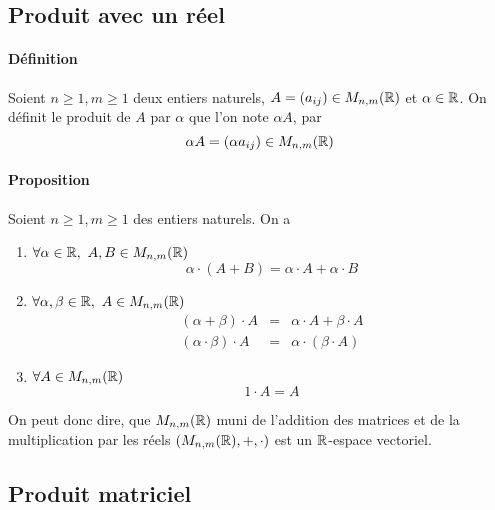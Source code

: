 
%
\subsection{Produit avec un réel}
%
\paragraph{Définition} Soient $n \geq 1, m \geq 1$ deux entiers naturels, $A = (a_{ij}) \in M_{n, m}(\mathbb{R})$ et $\alpha \in \mathbb{R}$. On  définit le produit de $A$ par $\alpha$ que l'on note $\alpha A$, par
$$\alpha A = (\alpha a_{ij}) \in M_{n, m}(\mathbb{R})$$

\paragraph{Proposition} Soient $n \geq 1, m \geq 1$ des entiers naturels. On a
\begin{enumerate}
  \item $\forall \alpha \in \mathbb{R}, ~ A, B \in M_{n, m}(\mathbb{R})$ 
    $$\alpha \cdot (A + B) = \alpha \cdot A + \alpha \cdot B$$
    
  \item $\forall \alpha, \beta \in \mathbb{R}, ~ A \in M_{n, m}(\mathbb{R})$
    \begin{eqnarray*}
      (\alpha + \beta) \cdot A &=& \alpha \cdot A + \beta \cdot A \\
      (\alpha \cdot \beta) \cdot A &=& \alpha \cdot (\beta \cdot A)
    \end{eqnarray*}
    
  \item $\forall A \in M_{n, m}(\mathbb{R})$
    $$1 \cdot A = A$$
\end{enumerate}
On peut donc dire, que $M_{n, m}(\mathbb{R})$ muni de l'addition des matrices et de la multiplication par les réels $(M_{n, m}(\mathbb{R}), +, \cdot)$ est un $\mathbb{R}$-espace vectoriel.

%
\subsection{Produit matriciel}
%
